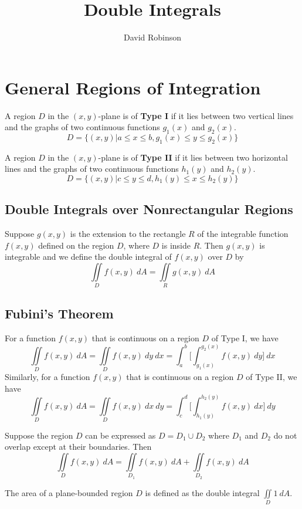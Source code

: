 \documentclass{article}
\title{Double Integrals}
\author{David Robinson}
\date{}
\begin{document}
\maketitle

\section*{General Regions of Integration}

A region $D$ in the $(x,y)$-plane is of \textbf{Type I} if it lies between two vertical lines and the graphs of two continuous functions $g_1(x)$ and $g_2(x)$.
\[D=\{(x,y)|a\leq x\leq b, g_1(x)\leq y\leq g_2(x)\}\]

A region $D$ in the $(x,y)$-plane is of \textbf{Type II} if it lies between two horizontal lines and the graphs of two continuous functions $h_1(y)$ and $h_2(y)$.
\[D=\{(x,y)|c\leq y\leq d, h_1(y)\leq x\leq h_2(y)\}\]

\subsection*{Double Integrals over Nonrectangular Regions}

Suppose $g(x,y)$ is the extension to the rectangle $R$ of the integrable function $f(x,y)$ defined on the region $D$, where $D$ is inside $R$. Then $g(x,y)$ is integrable and we define the double integral of $f(x,y)$ over $D$ by
\[\iint\limits_D f(x, y)\: dA=\iint\limits_R g(x,y)\: dA\]

\subsection*{Fubini's Theorem}

For a function $f(x,y)$ that is continuous on a region $D$ of Type I, we have
\[\iint\limits_D f(x,y)\: dA=\iint\limits_D f(x,y)\: dy\: dx=\int_a^b\Bigg[\int_{g_1(x)}^{g_2(x)}f(x,y)\: dy\Bigg]\: dx\]
Similarly, for a function $f(x,y)$ that is continuous on a region $D$ of Type II, we have
\[\iint\limits_D f(x,y)\: dA=\iint\limits_D f(x,y)\: dx\: dy=\int_c^d\Bigg[\int_{h_1(y)}^{h_2(y)}f(x,y)\: dx\Bigg]\: dy\]

Suppose the region $D$ can be expressed as $D=D_1\cup D_2$ where $D_1$ and $D_2$ do not overlap except at their boundaries. Then
\[\iint\limits_D f(x,y)\: dA=\iint\limits_{D_1} f(x,y)\: dA + \iint\limits_{D_2} f(x,y)\: dA\]

The area of a plane-bounded region $D$ is defined as the double integral $\iint\limits_D 1\: dA$.
\vspace{1em}
\end{document}
